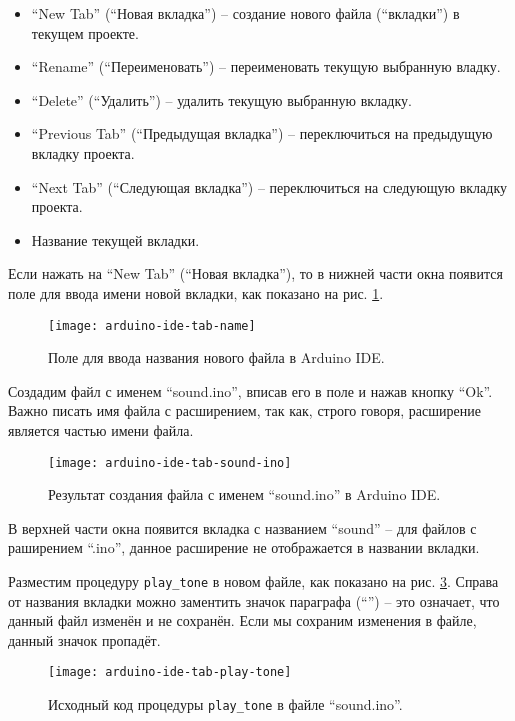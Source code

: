 \documentclass[../sparc.tex]{subfiles}
\begin{document}
\begin{itemize}
\item ``New Tab'' (``Новая вкладка'') -- создание нового файла (``вкладки'') в
  текущем проекте.
\item ``Rename'' (``Переименовать'') -- переименовать текущую выбранную владку.
\item ``Delete'' (``Удалить'') -- удалить текущую выбранную вкладку.
\item ``Previous Tab'' (``Предыдущая вкладка'') -- переключиться на предыдущую
  вкладку проекта.
\item ``Next Tab'' (``Следующая вкладка'') -- переключиться на следующую вкладку
  проекта.
\item Название текущей вкладки.
\end{itemize}

Если нажать на ``New Tab'' (``Новая вкладка''), то в нижней части окна появится
поле для ввода имени новой вкладки, как показано на
рис. \ref{fig:arduino-ide-tab-name}.

\begin{figure}[H]
  \centering
  \texttt{[image: arduino-ide-tab-name]}
  \caption{Поле для ввода названия нового файла в Arduino IDE.}
  \label{fig:arduino-ide-tab-name}
\end{figure}

Создадим файл с именем ``sound.ino'', вписав его в поле и нажав кнопку ``Ok''.
Важно писать имя файла с расширением, так как, строго говоря, расширение
является частью имени файла.

\begin{figure}[H]
  \centering
  \texttt{[image: arduino-ide-tab-sound-ino]}
  \caption{Результат создания файла с именем ``sound.ino'' в Arduino IDE.}
  \label{fig:arduino-ide-tab-sound-ino}
\end{figure}

В верхней части окна появится вкладка с названием ``sound'' -- для файлов с
раширением ``.ino'', данное расширение не отображается в названии вкладки.

Разместим процедуру \texttt{play_tone} в новом файле, как показано на
рис. \ref{fig:arduino-ide-tab-play-tone}.  Справа от названия вкладки можно
заментить значок параграфа (``\textsection'') -- это означает, что данный файл изменён и не
сохранён.  Если мы сохраним изменения в файле, данный значок пропадёт.

\begin{figure}[H]
  \centering
  \texttt{[image: arduino-ide-tab-play-tone]}
  \caption{Исходный код процедуры \texttt{play_tone} в файле ``sound.ino''.}
  \label{fig:arduino-ide-tab-play-tone}
\end{figure}
\end{document}
